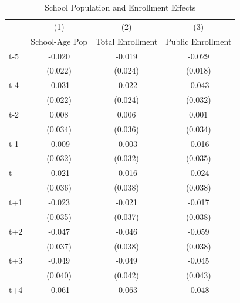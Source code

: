 \begin{table}[htbp]\centering
\def\sym#1{\ifmmode^{#1}\else\(^{#1}\)\fi}
\caption{School Population and Enrollment Effects}
\begin{tabular}{l*{3}{c}}
\hline\hline
            &\multicolumn{1}{c}{(1)}&\multicolumn{1}{c}{(2)}&\multicolumn{1}{c}{(3)}\\
            &\multicolumn{1}{c}{School-Age Pop}&\multicolumn{1}{c}{Total Enrollment}&\multicolumn{1}{c}{Public Enrollment}\\
\hline
t-5         &      -0.020         &      -0.019         &      -0.029         \\
            &     (0.022)         &     (0.024)         &     (0.018)         \\
[1em]
t-4         &      -0.031         &      -0.022         &      -0.043         \\
            &     (0.022)         &     (0.024)         &     (0.032)         \\
[1em]
t-2         &       0.008         &       0.006         &       0.001         \\
            &     (0.034)         &     (0.036)         &     (0.034)         \\
[1em]
t-1         &      -0.009         &      -0.003         &      -0.016         \\
            &     (0.032)         &     (0.032)         &     (0.035)         \\
[1em]
t           &      -0.021         &      -0.016         &      -0.024         \\
            &     (0.036)         &     (0.038)         &     (0.038)         \\
[1em]
t+1         &      -0.023         &      -0.021         &      -0.017         \\
            &     (0.035)         &     (0.037)         &     (0.038)         \\
[1em]
t+2         &      -0.047         &      -0.046         &      -0.059         \\
            &     (0.037)         &     (0.038)         &     (0.038)         \\
[1em]
t+3         &      -0.049         &      -0.049         &      -0.045         \\
            &     (0.040)         &     (0.042)         &     (0.043)         \\
[1em]
t+4         &      -0.061         &      -0.063         &      -0.048         \\

\end{tabular}
\end{table}
